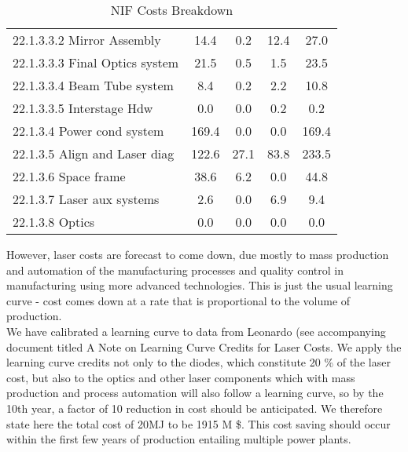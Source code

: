 \begin{table}[h!]
{\begin{tabular}{lcccc}
\hspace{10mm}22.1.3.3.2 Mirror Assembly & 14.4 & 0.2 & 12.4 & 27.0 \\
\hspace{10mm}22.1.3.3.3 Final Optics system & 21.5 & 0.5 & 1.5 & 23.5 \\
\hspace{10mm}22.1.3.3.4 Beam Tube system & 8.4 & 0.2 & 2.2 & 10.8 \\
\hspace{10mm}22.1.3.3.5 Interstage Hdw & 0.0 & 0.0 & 0.2 & 0.2 \\
\hspace{5mm}22.1.3.4 Power cond system & 169.4 & 0.0 & 0.0 & 169.4 \\
\hspace{5mm}22.1.3.5 Align and Laser diag & 122.6 & 27.1 & 83.8 & 233.5 \\
\hspace{5mm}22.1.3.6 Space frame & 38.6 & 6.2 & 0.0 & 44.8 \\
\hspace{5mm}22.1.3.7 Laser aux systems & 2.6 & 0.0 & 6.9 & 9.4 \\
\hspace{5mm}22.1.3.8 Optics & 0.0 & 0.0 & 0.0 & 0.0 \\
\hline
\end{tabular}}
\caption{NIF Costs Breakdown}
\label{tab:nif_costs}
\end{table}

 However, laser costs are forecast to come down, due mostly to mass production and automation of the manufacturing processes and  
 quality control in manufacturing using more advanced technologies.   
 This is just the usual learning curve - cost comes down at a rate that is proportional to the volume of production.  \\ 

 We have calibrated a learning curve to data from Leonardo (see accompanying document titled A Note on Learning Curve Credits for Laser Costs. 
 We apply the learning curve credits not only to the diodes, which constitute 20 \% of the laser cost, but also to the  
 optics and other laser components which with mass production and process automation will also follow a learning curve, so  
 by the 10th year, a factor of 10 reduction in cost should be anticipated.  We therefore state here the total cost of 20MJ  
 to be 1915 M \$.  This cost saving should occur within the first few years of production entailing multiple power plants. \\

